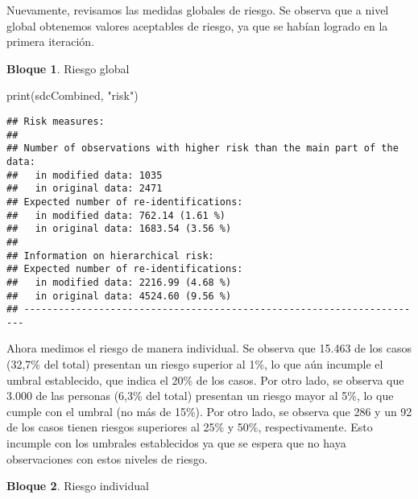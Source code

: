 \documentclass[
]{book}
\newenvironment{Shaded}{\begin{snugshade}}{\end{snugshade}}
\newcommand{\CommentTok}[1]{\textcolor[rgb]{0.56,0.35,0.01}{\textit{#1}}}
\newcommand{\FloatTok}[1]{\textcolor[rgb]{0.00,0.00,0.81}{#1}}
\newcommand{\FunctionTok}[1]{\textcolor[rgb]{0.00,0.00,0.00}{#1}}
\newcommand{\NormalTok}[1]{#1}
\newcommand{\SpecialCharTok}[1]{\textcolor[rgb]{0.00,0.00,0.00}{#1}}
\newcommand{\StringTok}[1]{\textcolor[rgb]{0.31,0.60,0.02}{#1}}
\theoremstyle{definition}
\theoremstyle{definition}
\newtheorem{example}{Bloque}[chapter]
\theoremstyle{definition}
\theoremstyle{definition}
\theoremstyle{remark}
\begin{document}
Nuevamente, revisamos las medidas globales de riesgo. Se observa que a nivel global obtenemos valores aceptables de riesgo, ya que se habían logrado en la primera iteración.

\begin{example}
\protect\hypertarget{exm:bloque60nbm}{}\label{exm:bloque60nbm}Riesgo global
\end{example}

\begin{Shaded}
\begin{Highlighting}[]
\FunctionTok{print}\NormalTok{(sdcCombined, }\StringTok{"risk"}\NormalTok{)}
\end{Highlighting}
\end{Shaded}

\begin{verbatim}
## Risk measures:
## 
## Number of observations with higher risk than the main part of the data: 
##   in modified data: 1035
##   in original data: 2471
## Expected number of re-identifications: 
##   in modified data: 762.14 (1.61 %)
##   in original data: 1683.54 (3.56 %)
## 
## Information on hierarchical risk:
## Expected number of re-identifications: 
##   in modified data: 2216.99 (4.68 %)
##   in original data: 4524.60 (9.56 %)
## ----------------------------------------------------------------------
\end{verbatim}

Ahora medimos el riesgo de manera individual. Se observa que 15.463 de los casos (32,7\% del total) presentan un riesgo superior al 1\%, lo que aún incumple el umbral establecido, que indica el 20\% de los casos. Por otro lado, se observa que 3.000 de las personas (6,3\% del total) presentan un riesgo mayor al 5\%, lo que cumple con el umbral (no más de 15\%). Por otro lado, se observa que 286 y un 92 de los casos tienen riesgos superiores al 25\% y 50\%, respectivamente. Esto incumple con los umbrales establecidos ya que se espera que no haya observaciones con estos niveles de riesgo.

\begin{example}
\protect\hypertarget{exm:bloque61nbm}{}\label{exm:bloque61nbm}Riesgo individual
\end{example}

\begin{Shaded}
\end{Shaded}
\end{document}
